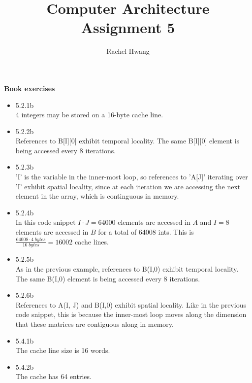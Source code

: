 \documentclass[a4paper]{article}
\title{Computer Architecture Assignment 5}
\author{Rachel Hwang}
\begin{document}
\maketitle

\textbf{\large{Book exercises}}
\begin{itemize}
\item{5.2.1b} \\
4 integers may be stored on a 16-byte cache line. \\


\item{5.2.2b} \\
References to B[I][0] exhibit temporal locality. The same B[I][0] element is being accessed every 8 iterations. \\


\item{5.2.3b} \\
'I' is the variable in the inner-most loop, so references to 'A[J]' iterating over 'I' exhibit spatial locality, since at each iteration we are accessing the next element in the array, which is continguous in memory. \\


\item{5.2.4b} \\
In this code snippet $I\cdot J = 64000$ elements are accessed in $A$ and $I = 8$ elements are accessed in $B$ for a total of 64008 ints. This is $\frac{64008\cdot 4\;bytes}{16 \;bytes} = 16002$ cache lines. \\


\item{5.2.5b} \\
As in the previous example, references to B(I,0) exhibit temporal locality. The same B(I,0) element is being accessed every 8 iterations. \\


\item{5.2.6b} \\
References to A(I, J) and B(I,0) exhibit spatial locality. Like in the previous code snippet, this is because the inner-most loop moves along the dimension that these matrices are contiguous along in memory.


\item{5.4.1b} \\
The cache line size is 16 words. \\


\item{5.4.2b} \\
The cache has 64 entries. \\



\end{itemize}
\end{document}
